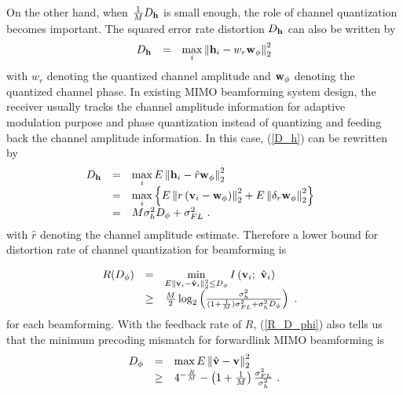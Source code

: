 \documentclass[10pt,fleqn, twocolumn]{IEEEtran}
\newcommand{\bh}{{\bf h}}
\newcommand{\bv}{{\bf v}}
\newcommand{\bw}{{\bf w}}
\begin{document}
On the other hand, when $\frac{1}{M}D_{\bh}$ is small enough, the
role of channel quantization becomes important. The squared error
rate distortion $D_{\bh}$ can also be written by
\begin{equation}%
\begin{array}{rcl}
D_{\bh}&=&\max\limits_{i}\left\|\bh_{i}-w_{r}{\bw}_{\phi}\right\|_{2}^{2}
\end{array}\label{D_h}
\end{equation}
\noindent with $w_{r}$ denoting the quantized channel amplitude
and ${\bw}_{\phi}$ denoting the quantized channel phase. In
existing MIMO beamforming system design, the receiver usually
tracks the channel amplitude information for adaptive modulation
purpose and phase quantization instead of quantizing and feeding
back the channel amplitude information. In this case, (\ref{D_h})
can be rewritten by
\begin{equation}\hspace{-0.10in}
\begin{array}{rcl}
D_{\bh}&=&\max\limits_{i}\mbox{E}\left\|\bh_{i}-\hat{r}{\bw}_{\phi}\right\|_{2}^{2}\\
&=&\max\limits_{i}\left\{\mbox{E}\left\|r\left(\bv_{i}-{\bw}_{\phi}\right)\right\|_{2}^{2}+\mbox{E}\left\|\delta_{r}{\bw}_{\phi}\right\|_{2}^{2}\right\}\\
&=&M\sigma_{h}^{2}D_{\phi}+\sigma_{\mbox{\tiny FL}}^{2}\ .
\end{array}\label{D_h2}
\end{equation}
\noindent with $\hat{r}$ denoting the channel amplitude estimate.
Therefore a lower bound for distortion rate of channel
quantization for beamforming is

\begin{equation}\hspace{-0.10in}
\begin{array}{rcl}
R(D_{\phi})&=&\min\limits_{E\|\bv_{i}-\hat{\bv}_{i}\|_{2}^{2}\leq
D_{\phi}} I\left(\bv_{i};\
\hat{\bv}_{i}\right)\\
&\geq&\frac{M}{2}\log_{2}\left(\frac{\sigma_{h}^{2}}{(1+\frac{1}{M})\sigma_{\mbox{\tiny
FL}}^{2}+\sigma_{h}^{2}D_{\phi}}\right)\ .
\end{array}\label{R_D_phi}
\end{equation}
\noindent for each beamforming. With the feedback rate of $R$,
(\ref{R_D_phi}) also tells us that the minimum precoding mismatch
for forwardlink MIMO beamforming is
\begin{equation}%
\begin{array}{rcl}
D_{\phi}&=&\max\mbox{E}\left\|\hat{\bv}-\bv\right\|_{2}^{2}\\
 &\geq&4^{-\frac{R}{M}}-\left(1+\frac{1}{M}\right)\frac{\sigma_{\mbox{\tiny
FL}}^{2}}{\sigma_{h}^{2}}\ .
\end{array}\label{D_phi}
\end{equation}
\end{document}

